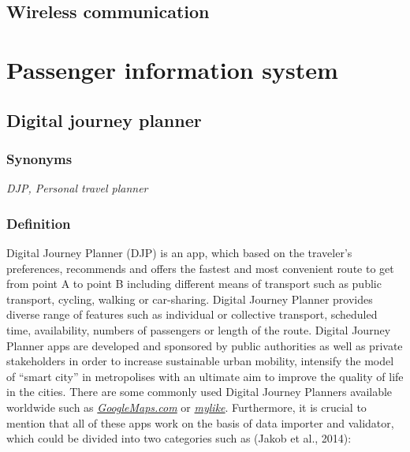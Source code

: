\documentclass[
]{book}
\begin{document}
\hypertarget{wireless_com}{%
\section{Wireless communication}\label{wireless_com}}

\hypertarget{passenger}{%
\chapter{Passenger information system}\label{passenger}}

\hypertarget{djp}{%
\section{Digital journey planner}\label{djp}}

\hypertarget{synonyms-10}{%
\subsection*{Synonyms}\label{synonyms-10}}

\emph{DJP, Personal travel planner}

\hypertarget{definition-10}{%
\subsection*{Definition}\label{definition-10}}

Digital Journey Planner (DJP) is an app, which based on the traveler's preferences, recommends and offers the fastest and most convenient route to get from point A to point B including different means of transport such as public transport, cycling, walking or car-sharing. Digital Journey Planner provides diverse range of features such as individual or collective transport, scheduled time, availability, numbers of passengers or length of the route. Digital Journey Planner apps are developed and sponsored by public authorities as well as private stakeholders in order to increase sustainable urban mobility, intensify the model of ``smart city'' in metropolises with an ultimate aim to improve the quality of life in the cities.
There are some commonly used Digital Journey Planners available worldwide such as \href{https://www.google.com/maps}{\emph{GoogleMaps.com}} or \href{https://mylike.io/personal-travel-planner/}{\emph{mylike}}. Furthermore, it is crucial to mention that all of these apps work on the basis of data importer and validator, which could be divided into two categories such as (Jakob et al., 2014):
\end{document}
